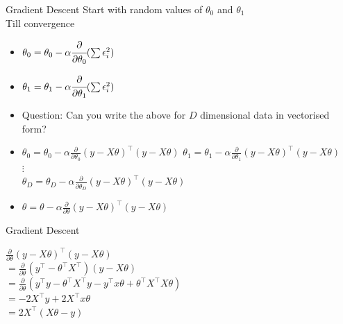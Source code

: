 \documentclass[usenames,dvipsnames]{beamer}
\begin{document}
\begin{frame}{Gradient Descent}
Start with random values of $\theta_{0}$ and $\theta_{1}$\\
Till convergence
\begin{itemize}[<+->]
	\item $\theta_{0} = \theta_{0} - \alpha\cfrac{\partial}{\partial \theta_{0}} (\sum \epsilon_{i}^{2}) $
	\item $\theta_{1} = \theta_{1} - \alpha \cfrac{\partial}{\partial \theta_{1}} (\sum \epsilon_{i}^{2}) $
	\item Question: Can you write the above for $D$ dimensional data in vectorised form?
	\item	\(\theta_{0}=\theta_{0}-\alpha \frac{\partial}{\partial \theta_{0}}\left(y-X\theta\right)^{\top}\left(y-X\theta\right)\)
	\(\theta_{1}=\theta_{1}-\alpha \frac{\partial}{\partial \theta_{1}}\left(y-X\theta\right)^{\top}\left(y-X\theta\right)\) 
	\\ $\vdots$
	\\	\(\theta_{D}=\theta_{D}-\alpha \frac{\partial}{\partial \theta_{D}}\left(y-X\theta\right)^{\top}\left(y-X\theta\right)\)
	\item \(\theta=\theta - \alpha \frac{\partial}{\partial \theta}\left(y-X\theta\right)^{\top}\left(y-X\theta\right)\) 

\end{itemize}
\end{frame}

\begin{frame}{Gradient Descent}


\(\frac{\partial}{\partial \theta}(y-X \theta)^{\top}(y-X \theta)\)
\\ \(=\frac{\partial}{\partial \theta}\left(y^{\top}-\theta^{\top} X^{\top}\right)(y-X \theta)\)
\\ \(=\frac{\partial}{\partial \theta}\left(y^{\top} y-\theta^{\top} X^{\top} y-y^{\top} x \theta+\theta^{\top} X^{\top} X \theta\right)\)
\\ \(=-2 X^{\top} y+2 X^{\top} x \theta\)
\\ \(=2 X^{\top}(X \theta-y)\)
	

\end{frame}
\end{document}
